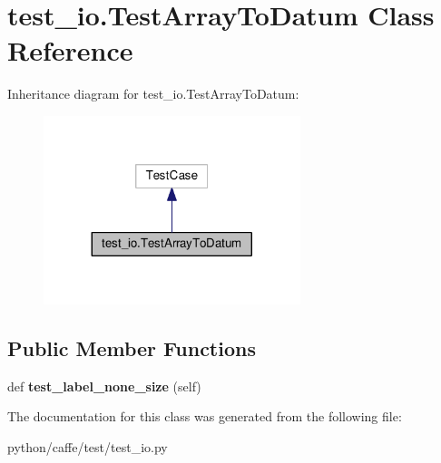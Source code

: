 \hypertarget{classtest__io_1_1_test_array_to_datum}{}\section{test\+\_\+io.\+Test\+Array\+To\+Datum Class Reference}
\label{classtest__io_1_1_test_array_to_datum}


Inheritance diagram for test\+\_\+io.\+Test\+Array\+To\+Datum\+:
\nopagebreak
\begin{figure}[H]
\begin{center}
\leavevmode
\includegraphics[width=212pt]{classtest__io_1_1_test_array_to_datum__inherit__graph}
\end{center}
\end{figure}
\subsection*{Public Member Functions}
\begin{DoxyCompactItemize}
\item 
\mbox{\label{classtest__io_1_1_test_array_to_datum_ad424115a8fd82eaa591de6c625cacd2f}} 
def {\bfseries test\+\_\+label\+\_\+none\+\_\+size} (self)
\end{DoxyCompactItemize}


The documentation for this class was generated from the following file\+:\begin{DoxyCompactItemize}
\item 
python/caffe/test/test\+\_\+io.\+py\end{DoxyCompactItemize}
